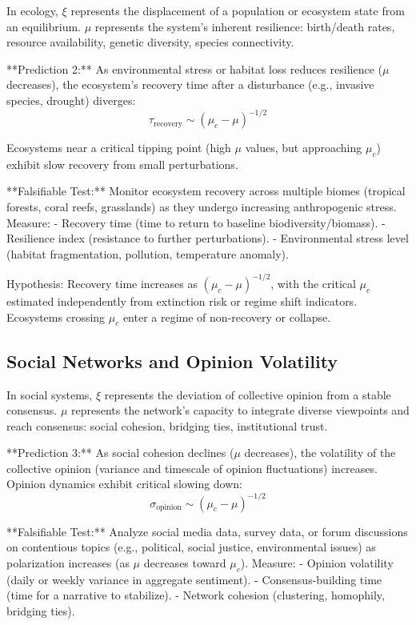 \documentclass[12pt]{article}
\begin{document}
In ecology, $\xi$ represents the displacement of a population or ecosystem state from an equilibrium. $\mu$ represents the system's inherent resilience: birth/death rates, resource availability, genetic diversity, species connectivity.

**Prediction 2:** As environmental stress or habitat loss reduces resilience ($\mu$ decreases), the ecosystem's recovery time after a disturbance (e.g., invasive species, drought) diverges:
\begin{equation}
\tau_{\text{recovery}} \sim (\mu_c - \mu)^{-1/2}
\end{equation}

Ecosystems near a critical tipping point (high $\mu$ values, but approaching $\mu_c$) exhibit slow recovery from small perturbations.

**Falsifiable Test:** Monitor ecosystem recovery across multiple biomes (tropical forests, coral reefs, grasslands) as they undergo increasing anthropogenic stress. Measure:
- Recovery time (time to return to baseline biodiversity/biomass).
- Resilience index (resistance to further perturbations).
- Environmental stress level (habitat fragmentation, pollution, temperature anomaly).

Hypothesis: Recovery time increases as $(\mu_c - \mu)^{-1/2}$, with the critical $\mu_c$ estimated independently from extinction risk or regime shift indicators. Ecosystems crossing $\mu_c$ enter a regime of non-recovery or collapse.

\subsection{Social Networks and Opinion Volatility}

In social systems, $\xi$ represents the deviation of collective opinion from a stable consensus. $\mu$ represents the network's capacity to integrate diverse viewpoints and reach consensus: social cohesion, bridging ties, institutional trust.

**Prediction 3:** As social cohesion declines ($\mu$ decreases), the volatility of the collective opinion (variance and timescale of opinion fluctuations) increases. Opinion dynamics exhibit critical slowing down:
\begin{equation}
\sigma_{\text{opinion}} \sim (\mu_c - \mu)^{-1/2}
\end{equation}

**Falsifiable Test:** Analyze social media data, survey data, or forum discussions on contentious topics (e.g., political, social justice, environmental issues) as polarization increases (as $\mu$ decreases toward $\mu_c$). Measure:
- Opinion volatility (daily or weekly variance in aggregate sentiment).
- Consensus-building time (time for a narrative to stabilize).
- Network cohesion (clustering, homophily, bridging ties).
\end{document}
